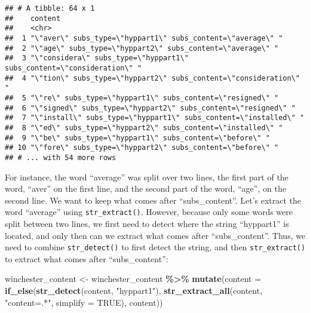 \documentclass[
]{article}
\newenvironment{Shaded}{\begin{snugshade}}{\end{snugshade}}
\newcommand{\DataTypeTok}[1]{\textcolor[rgb]{0.13,0.29,0.53}{#1}}
\newcommand{\KeywordTok}[1]{\textcolor[rgb]{0.13,0.29,0.53}{\textbf{#1}}}
\newcommand{\NormalTok}[1]{#1}
\newcommand{\OperatorTok}[1]{\textcolor[rgb]{0.81,0.36,0.00}{\textbf{#1}}}
\newcommand{\OtherTok}[1]{\textcolor[rgb]{0.56,0.35,0.01}{#1}}
\newcommand{\StringTok}[1]{\textcolor[rgb]{0.31,0.60,0.02}{#1}}
\begin{document}
\begin{verbatim}
## # A tibble: 64 x 1
##    content                                                               
##    <chr>                                                                 
##  1 "\"aver\" subs_type=\"hyppart1\" subs_content=\"average\" "           
##  2 "\"age\" subs_type=\"hyppart2\" subs_content=\"average\" "            
##  3 "\"considera\" subs_type=\"hyppart1\" subs_content=\"consideration\" "
##  4 "\"tion\" subs_type=\"hyppart2\" subs_content=\"consideration\" "     
##  5 "\"re\" subs_type=\"hyppart1\" subs_content=\"resigned\" "            
##  6 "\"signed\" subs_type=\"hyppart2\" subs_content=\"resigned\" "        
##  7 "\"install\" subs_type=\"hyppart1\" subs_content=\"installed\" "      
##  8 "\"ed\" subs_type=\"hyppart2\" subs_content=\"installed\" "           
##  9 "\"be\" subs_type=\"hyppart1\" subs_content=\"before\" "              
## 10 "\"fore\" subs_type=\"hyppart2\" subs_content=\"before\" "            
## # ... with 54 more rows
\end{verbatim}

For instance, the word ``average'' was split over two lines, the first part of the word, ``aver'' on the
first line, and the second part of the word, ``age'', on the second line. We want to keep what comes
after ``subs\_content''. Let's extract the word ``average'' using \texttt{str\_extract()}. However, because only
some words were split between two lines, we first need to detect where the string ``hyppart1'' is
located, and only then can we extract what comes after ``subs\_content''. Thus, we need to combine
\texttt{str\_detect()} to first detect the string, and then \texttt{str\_extract()} to extract what comes after
``subs\_content'':

\begin{Shaded}
\begin{Highlighting}[]
\NormalTok{winchester\_content \textless{}{-}}\StringTok{ }\NormalTok{winchester\_content }\OperatorTok{\%\textgreater{}\%}\StringTok{ }
\StringTok{  }\KeywordTok{mutate}\NormalTok{(}\DataTypeTok{content =} \KeywordTok{if\_else}\NormalTok{(}\KeywordTok{str\_detect}\NormalTok{(content, }\StringTok{"hyppart1"}\NormalTok{), }
                           \KeywordTok{str\_extract\_all}\NormalTok{(content, }\StringTok{"content=.*"}\NormalTok{, }\DataTypeTok{simplify =} \OtherTok{TRUE}\NormalTok{), }
\NormalTok{                           content))}
\end{Highlighting}
\end{Shaded}
\end{document}
